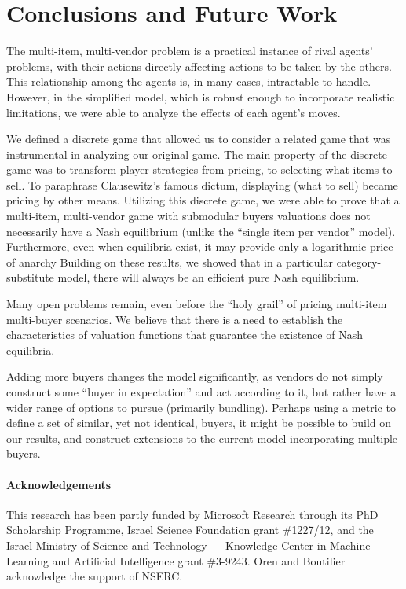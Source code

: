 \section{Conclusions and Future Work}

The multi-item, multi-vendor problem is a practical instance of rival agents' problems, with their actions directly affecting actions to be taken by the others. This relationship among the agents is, in many cases, intractable to handle. However, in the simplified model, which is robust enough to incorporate realistic limitations, we were able to analyze the effects of each agent's moves. 

We defined a discrete game that allowed us to consider a related game that was instrumental in analyzing our original game. The main property of the discrete game was to transform player strategies from pricing, to selecting what items to sell. To paraphrase Clausewitz's famous dictum, displaying (what to sell) became pricing by other means. Utilizing this discrete game, we were able to prove that a multi-item, multi-vendor game with submodular buyers valuations does not necessarily have a Nash equilibrium (unlike the ``single item per vendor'' model). Furthermore, even when equilibria exist, it may provide only a logarithmic price of anarchy%
Building on these results, we showed that in a particular%
category-substitute model, there will always be an efficient pure Nash equilibrium.

Many open problems remain, even before the ``holy grail'' of pricing multi-item multi-buyer scenarios. We believe that there is a need to establish the characteristics of valuation functions that guarantee the existence of  Nash equilibria.%

Adding more buyers changes the model significantly, as vendors do not simply construct some ``buyer in expectation'' and act according to it, but rather have a wider range of options to pursue (primarily bundling). Perhaps using a metric to define a set of similar, yet not identical, buyers, it might be possible to build on our results, and construct extensions to the current model incorporating multiple buyers.
{\footnotesize
\paragraph{Acknowledgements} This research has been partly funded by Microsoft Research through its PhD Scholarship Programme, Israel Science Foundation grant \#1227/12, and the Israel Ministry of Science and Technology --- Knowledge Center in Machine Learning and Artificial Intelligence grant \#3-9243. Oren and Boutilier acknowledge the support of NSERC.}
